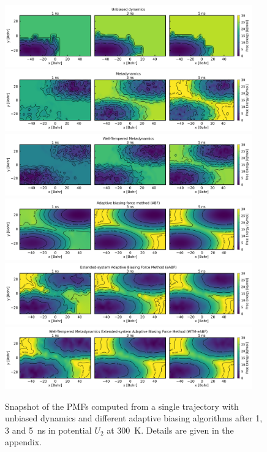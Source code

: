 \begin{figure}[H]
  \centering
  \includegraphics[width=0.95\textwidth]{bilder/test_2D/reference_freeE} \\
  \includegraphics[width=0.95\textwidth]{bilder/test_2D/metaD_freeE} \\
  \includegraphics[width=0.95\textwidth]{bilder/test_2D/WTM_freeE} \\
  \includegraphics[width=0.95\textwidth]{bilder/test_2D/ABF_freeE}  \\
  \includegraphics[width=0.95\textwidth]{bilder/test_2D/eABF_freeE} \\
  \includegraphics[width=0.95\textwidth]{bilder/test_2D/meta_eABF_freeE}
  \caption{
  Snapshot of the PMFs computed from a single trajectory with unbiased dynamics and different adaptive biasing algorithms after 1, 3 and 5~ns in potential $U_2$ at 300~K. Details are given in the appendix.}
\label{fig:2D ABF}%
\end{figure}
